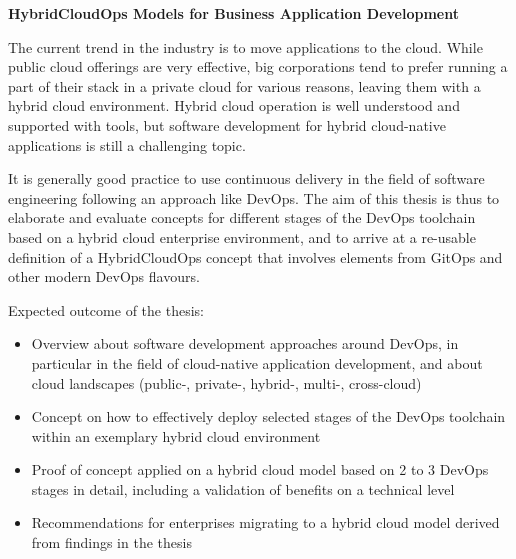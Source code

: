 \documentclass[../main.tex]{subfiles}
\begin{document}
    \textbf{HybridCloudOps Models for Business Application Development}

    The current trend in the industry is to move applications to the cloud.
    While public cloud offerings are very effective, big corporations tend to prefer running a part of their stack in a private cloud for various reasons, leaving them with a hybrid cloud environment.
    Hybrid cloud operation is well understood and supported with tools, but software development for hybrid cloud-native applications is still a challenging topic.

    It is generally good practice to use continuous delivery in the field of software engineering following an approach like DevOps.
    The aim of this thesis is thus to elaborate and evaluate concepts for different stages of the DevOps toolchain based on a hybrid cloud enterprise environment, and to arrive at a re-usable definition of a HybridCloudOps concept that involves elements from GitOps and other modern DevOps flavours.

    Expected outcome of the thesis:
    \begin{itemize}
        \item Overview about software development approaches around DevOps, in particular in the field of cloud-native application development, and about cloud landscapes (public-, private-, hybrid-, multi-, cross-cloud)
        \item Concept on how to effectively deploy selected stages of the DevOps toolchain within an exemplary hybrid cloud environment
        \item Proof of concept applied on a hybrid cloud model based on 2 to 3 DevOps stages in detail, including a validation of benefits on a technical level
        \item Recommendations for enterprises migrating to a hybrid cloud model derived from findings in the thesis
    \end{itemize}
\end{document}
